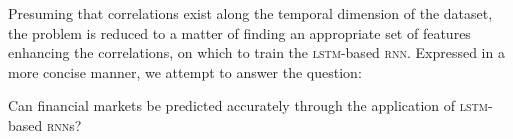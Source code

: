 Presuming that correlations exist along the temporal dimension of the dataset,
the problem is reduced to a matter of finding an appropriate set of
features enhancing the correlations, on which to train the
\textsc{lstm}-based \textsc{rnn}.  Expressed in a more concise manner, we
attempt to answer the question:

Can financial markets be predicted accurately through the application of
\textsc{lstm}-based \textsc{rnn}s?
